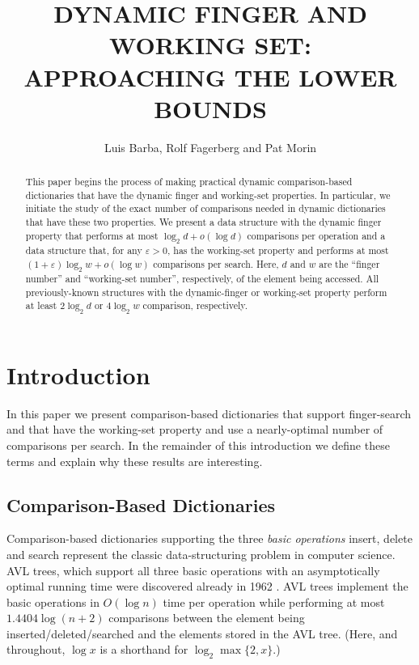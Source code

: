 \documentclass{patmorin}
\title{\MakeUppercase{Dynamic Finger and Working Set: Approaching the Lower Bounds}}
\author{Luis Barba, Rolf Fagerberg and Pat Morin}
\newcommand{\eps}{\varepsilon}
\begin{document}
\begin{titlepage}
\maketitle

\begin{abstract}
  This paper begins the process of making practical dynamic
  comparison-based dictionaries that have the dynamic finger and
  working-set properties.  In particular, we initiate the study of the
  exact number of comparisons needed in dynamic dictionaries that have
  these two properties.  We present a data structure with the dynamic
  finger property that performs at most $\log_2 d+o(\log d)$ comparisons
  per operation and a data structure that, for any $\eps > 0$, has the
  working-set property and performs at most $(1+\eps)\log_2 w+o(\log w)$
  comparisons per search.  Here, $d$ and $w$ are the ``finger number''
  and ``working-set number'', respectively, of the element being accessed.
  All previously-known structures with the dynamic-finger or working-set
  property perform at least $2\log_2 d$ or $4\log_2 w$ comparison,
  respectively.
\end{abstract}

\end{titlepage}

\section{Introduction}

In this paper we present comparison-based dictionaries that support
finger-search and that have the working-set property and use a
nearly-optimal number of comparisons per search.  In the remainder of
this introduction we define these terms and explain why these results
are interesting.

\subsection{Comparison-Based Dictionaries}

Comparison-based dictionaries supporting the three \emph{basic operations}
insert, delete and search represent the
classic data-structuring problem in computer science.  AVL trees, which
support all three basic operations with an asymptotically optimal running
time were discovered already in 1962 \cite{adelsson.vleski.ea:blah}.
AVL trees implement the basic operations in $O(\log n)$ time per operation
while performing at most $1.4404\log(n+2)$ comparisons between the element
being inserted/deleted/searched and the elements stored in the AVL tree.
(Here, and throughout, $\log x$ is a shorthand for $\log_2\max\{2,x\}$.)
\end{document}
